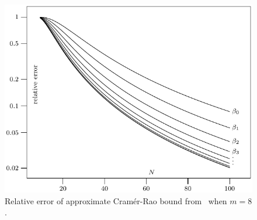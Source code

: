 \documentclass[review]{elsarticle}
\begin{document}
 \begin{figure}[p]
    	\centering 
   		\includegraphics{code/data/plot-4-mps.pdf} 
    		\caption{Relative error of approximate Cram\'{e}r-Rao bound from~\cite{Peleg1991_CRB_PPS_1991} when $m=8$.} 
    		\label{plot:relerror} 
 \end{figure}
\end{document}
